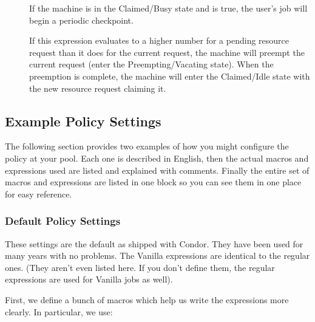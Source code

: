 \begin{description}
\item[] If the machine is in the
  Claimed/Busy state and  is true, the
  user's job will begin a periodic checkpoint.
  
\item[] If this expression evaluates to a higher number for
  a pending resource request than it does for the current request, the
  machine will preempt the current request (enter the
  Preempting/Vacating state).  When the preemption is complete, the
  machine will enter the Claimed/Idle state with the new resource
  request claiming it.

\end{description}

\subsection{\label{sec:Example-Policy}Example Policy Settings}

The following section provides two examples of how you might configure
the policy at your pool.  Each one is described in English, then the
actual macros and expressions used are listed and explained with
comments.  Finally the entire set of macros and expressions are listed
in one block so you can see them in one place for easy reference.

\subsubsection{\label{sec:Default-Policy}Default Policy Settings}

These settings are the default as shipped with Condor.  They have been
used for many years with no problems.  The Vanilla expressions are
identical to the regular ones. (They aren't even listed here.  If you
don't define them, the regular expressions are used for Vanilla jobs
as well).

First, we define a bunch of macros which help us write the expressions
more clearly.  In particular, we use:


